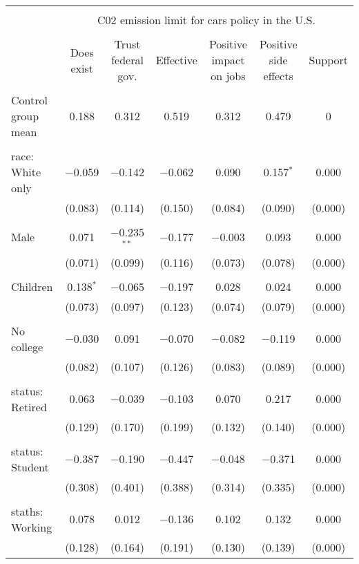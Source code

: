 
\begin{tabular}{@{\extracolsep{5pt}}lcccccc} 
\\[-1.8ex]\hline 
\hline \\[-1.8ex] 
 & \multicolumn{6}{c}{C02 emission limit for cars policy in the U.S.} \\ 
\cline{2-7} 
\\[-1.8ex] & Does exist & Trust federal gov. & Effective & Positive impact on jobs & Positive side effects & Support \\ 
\hline \\[-1.8ex] 
 Control group mean & 0.188 & 0.312 & 0.519 & 0.312 & 0.479 & 0  \\ \hline \\[-1.8ex] race: White only & $-$0.059 & $-$0.142 & $-$0.062 & 0.090 & 0.157$^{*}$ & 0.000 \\ 
  & (0.083) & (0.114) & (0.150) & (0.084) & (0.090) & (0.000) \\ 
  & & & & & & \\ 
 Male & 0.071 & $-$0.235$^{**}$ & $-$0.177 & $-$0.003 & 0.093 & 0.000 \\ 
  & (0.071) & (0.099) & (0.116) & (0.073) & (0.078) & (0.000) \\ 
  & & & & & & \\ 
 Children & 0.138$^{*}$ & $-$0.065 & $-$0.197 & 0.028 & 0.024 & 0.000 \\ 
  & (0.073) & (0.097) & (0.123) & (0.074) & (0.079) & (0.000) \\ 
  & & & & & & \\ 
 No college & $-$0.030 & 0.091 & $-$0.070 & $-$0.082 & $-$0.119 & 0.000 \\ 
  & (0.082) & (0.107) & (0.126) & (0.083) & (0.089) & (0.000) \\ 
  & & & & & & \\ 
 status: Retired & 0.063 & $-$0.039 & $-$0.103 & 0.070 & 0.217 & 0.000 \\ 
  & (0.129) & (0.170) & (0.199) & (0.132) & (0.140) & (0.000) \\ 
  & & & & & & \\ 
 status: Student & $-$0.387 & $-$0.190 & $-$0.447 & $-$0.048 & $-$0.371 & 0.000 \\ 
  & (0.308) & (0.401) & (0.388) & (0.314) & (0.335) & (0.000) \\ 
  & & & & & & \\ 
 staths: Working & 0.078 & 0.012 & $-$0.136 & 0.102 & 0.132 & 0.000 \\ 
  & (0.128) & (0.164) & (0.191) & (0.130) & (0.139) & (0.000) \\ 

\end{tabular}
